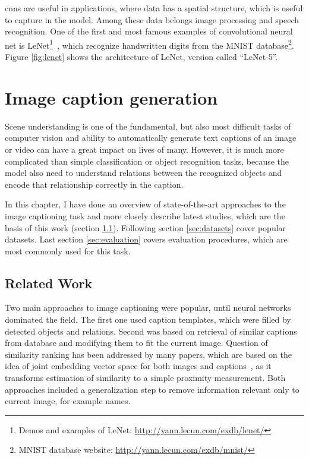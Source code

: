 \gls{cnn}s are useful in applications, where data has a spatial structure, which is useful to capture in the model. Among these data belongs image processing and speech recognition. One of the first and most famous examples of convolutional neural net is LeNet\footnote{Demos and examples of LeNet: \url{http://yann.lecun.com/exdb/lenet/}}~\cite{lecun-98}, which recognize handwritten digits from the MNIST database\footnote{MNIST database website: \url{http://yann.lecun.com/exdb/mnist/}}. Figure \ref{fig:lenet} shows the architecture of LeNet, version called \textquotedblleft LeNet-5\textquotedblright.

\chapter{Image caption generation}\label{chp:captions}

Scene understanding is one of the fundamental, but also most difficult tasks of computer vision and ability to automatically generate text captions of an image or video can have a great impact on lives of many. However, it is much more complicated than simple classification or object recognition tasks, because the model also need to understand relations between the recognized objects and encode that relationship correctly in the caption.

In this chapter, I have done an overview of state-of-the-art approaches to the image captioning task and more closely describe latest studies, which are the basis of this work (section \ref{sec:related}). Following section \ref{sec:datasets} cover popular datasets. Last section \ref{sec:evaluation} covers evaluation procedures, which are most commonly used for this task.

\section{Related Work}\label{sec:related}

Two main approaches to image captioning were popular, until neural networks dominated the field. The first one used caption templates, which were filled by detected objects and relations. Second was based on retrieval of similar captions from database and modifying them to fit the current image. Question of similarity ranking has been addressed by many papers, which are based on the idea of joint embedding vector space for both images and captions~\cite{DBLP:journals/corr/KarpathyF14}, as it transforms estimation of similarity to a simple proximity measurement. Both approaches included a generalization step to remove information relevant only to current image, for example names.

